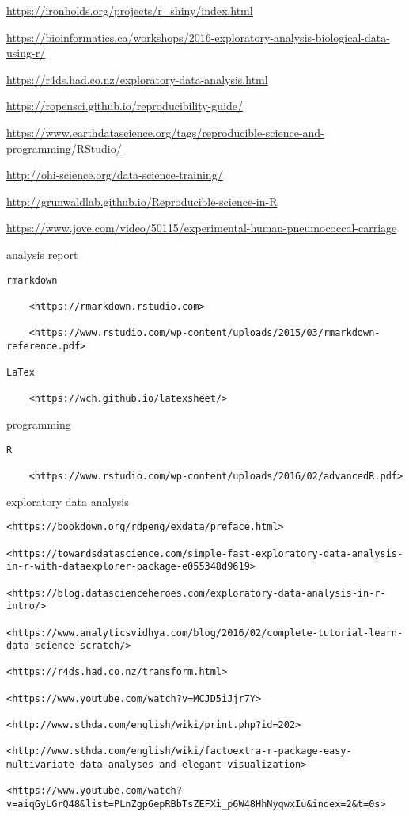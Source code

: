 \documentclass[
]{book}
\begin{document}
\url{https://ironholds.org/projects/r_shiny/index.html}

\url{https://bioinformatics.ca/workshops/2016-exploratory-analysis-biological-data-using-r/}

\url{https://r4ds.had.co.nz/exploratory-data-analysis.html}

\url{https://ropensci.github.io/reproducibility-guide/}

\url{https://www.earthdatascience.org/tags/reproducible-science-and-programming/RStudio/}

\url{http://ohi-science.org/data-science-training/}

\url{http://grunwaldlab.github.io/Reproducible-science-in-R}

\url{https://www.jove.com/video/50115/experimental-human-pneumococcal-carriage}

analysis report

\begin{verbatim}
rmarkdown

    <https://rmarkdown.rstudio.com>

    <https://www.rstudio.com/wp-content/uploads/2015/03/rmarkdown-reference.pdf>

LaTex

    <https://wch.github.io/latexsheet/>
\end{verbatim}

programming

\begin{verbatim}
R

    <https://www.rstudio.com/wp-content/uploads/2016/02/advancedR.pdf>
\end{verbatim}

exploratory data analysis

\begin{verbatim}
<https://bookdown.org/rdpeng/exdata/preface.html>

<https://towardsdatascience.com/simple-fast-exploratory-data-analysis-in-r-with-dataexplorer-package-e055348d9619>

<https://blog.datascienceheroes.com/exploratory-data-analysis-in-r-intro/>

<https://www.analyticsvidhya.com/blog/2016/02/complete-tutorial-learn-data-science-scratch/>

<https://r4ds.had.co.nz/transform.html>

<https://www.youtube.com/watch?v=MCJD5iJjr7Y>

<http://www.sthda.com/english/wiki/print.php?id=202>

<http://www.sthda.com/english/wiki/factoextra-r-package-easy-multivariate-data-analyses-and-elegant-visualization>

<https://www.youtube.com/watch?v=aiqGyLGrQ48&list=PLnZgp6epRBbTsZEFXi_p6W48HhNyqwxIu&index=2&t=0s>
\end{verbatim}
\end{document}
